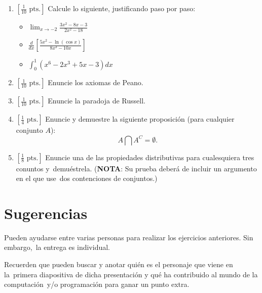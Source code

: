 \documentclass[paper=letter, fontsize=12pt]{scrartcl}
\begin{document}
\begin{enumerate}
\item $[\frac{1}{10}\mbox{ pts.}]$ Calcule lo siguiente, justificando paso por paso:
  \begin{itemize}
  \item $\lim_{x \to -2}\frac{3x^2 - 8x - 3}{2x^2 - 18}$
  \item $\frac{d}{dx} \left[ \frac{5x^2 - \ln (\cos x)}{8x^3 - 10x} \right]$
  \item $\int_0^1 (x^6 - 2x^3 + 5x - 3) dx$
  \end{itemize}
\item $[\frac{1}{10}\mbox{ pts.}]$ Enuncie los axiomas de Peano.
\item $[\frac{1}{10}\mbox{ pts.}]$ Enuncie la paradoja de Russell.
\item $[\frac{1}{4}\mbox{ pts.}]$ Enuncie y demuestre la siguiente proposición (para cualquier conjunto $A$):
  \[ A \bigcap A^C = \emptyset.\]
\item $[\frac{1}{8}\mbox{ pts.}]$ Enuncie una de las propiedades distributivas para cualesquiera tres conuntos y\
  demuéstrela. (\textbf{NOTA}: Su prueba deberá de incluir un argumento en el que use\
  dos contenciones de conjuntos.)
\end{enumerate}

\section*{Sugerencias}

Pueden ayudarse entre varias personas para realizar los ejercicios anteriores. Sin embargo,\
la entrega es individual.\par
Recuerden que pueden buscar y anotar quién es el personaje que viene en la\
primera diapositiva de dicha presentación y qué ha contribuido al mundo de la computación\
y/o programación para ganar un punto extra.
\end{document}
